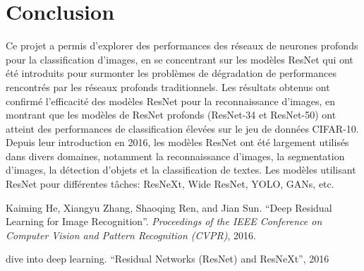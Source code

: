 \documentclass{article}
\begin{document}
\section{Conclusion}

Ce projet a permis d'explorer des performances des réseaux de neurones profonds pour la classification d'images,
en se concentrant sur les modèles ResNet qui ont été introduits pour surmonter les problèmes de dégradation de
performances rencontrés par les réseaux profonds traditionnels.
Les résultats obtenus ont confirmé l'efficacité des modèles ResNet pour la reconnaissance d'images, en montrant
que les modèles de ResNet profonds (ResNet-34 et ResNet-50) ont atteint des performances de classification élevées
sur le jeu de données CIFAR-10.
Depuis leur introduction en 2016, les modèles ResNet ont été largement utilisés dans divers domaines, notamment
la reconnaissance d'images, la segmentation d'images, la détection d'objets et la classification de textes.
Les modèles utilisant ResNet pour différentes tâches: ResNeXt, Wide ResNet, YOLO, GANs, etc.


\begin{thebibliography}{9}
Kaiming He, Xiangyu Zhang, Shaoqing Ren, and Jian Sun. ``Deep Residual Learning for Image Recognition''.
\emph{Proceedings of the IEEE Conference on Computer Vision and Pattern Recognition (CVPR)}, 2016.

dive into deep learning. ``Residual Networks (ResNet) and ResNeXt'', 2016
\end{thebibliography}
\end{document}
